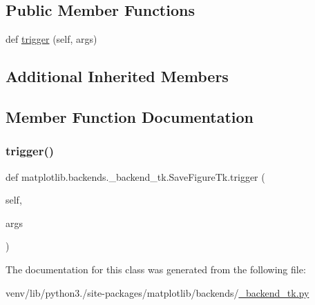 \subsection*{Public Member Functions}
\begin{DoxyCompactItemize}
\item 
def \hyperlink{classmatplotlib_1_1backends_1_1__backend__tk_1_1SaveFigureTk_aa9e0dc7da71255bee7692311d17ee247}{trigger} (self, args)
\end{DoxyCompactItemize}
\subsection*{Additional Inherited Members}


\subsection{Member Function Documentation}
\mbox{\label{classmatplotlib_1_1backends_1_1__backend__tk_1_1SaveFigureTk_aa9e0dc7da71255bee7692311d17ee247}} 
\subsubsection{\texorpdfstring{trigger()}{trigger()}}
{\footnotesize\ttfamily def matplotlib.\+backends.\+\_\+backend\+\_\+tk.\+Save\+Figure\+Tk.\+trigger (\begin{DoxyParamCaption}\item[{}]{self,  }\item[{}]{args }\end{DoxyParamCaption})}



The documentation for this class was generated from the following file\+:\begin{DoxyCompactItemize}
\item 
venv/lib/python3./site-\/packages/matplotlib/backends/\hyperlink{__backend__tk_8py}{\+\_\+backend\+\_\+tk.\+py}\end{DoxyCompactItemize}
